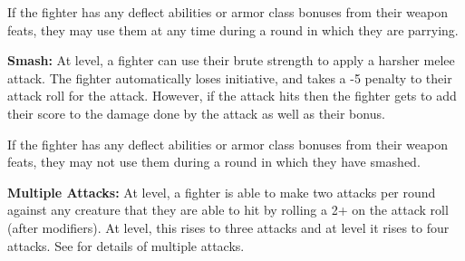 \begin{multicols*}{2}
If the fighter has any deflect abilities or armor class bonuses from their weapon feats, they may use them at any time during a round in which they are parrying.

\textbf{Smash:}\label{sec:Smash} At  level, a fighter can use their brute strength to apply a harsher melee attack. The fighter automatically loses initiative, and takes a -5 penalty to their attack roll for the attack. However, if the attack hits then the fighter gets to add their  score to the damage done by the attack as well as their  bonus.

If the fighter has any deflect abilities or armor class bonuses from their weapon feats, they may not use them during a round in which they have smashed.

\textbf{Multiple Attacks:} At  level, a fighter is able to make two attacks per round against any creature that they are able to hit by rolling a 2+ on the attack roll (after modifiers). At  level, this rises to three attacks and at  level it rises to four attacks. See  for details of multiple attacks.


\end{multicols*}
